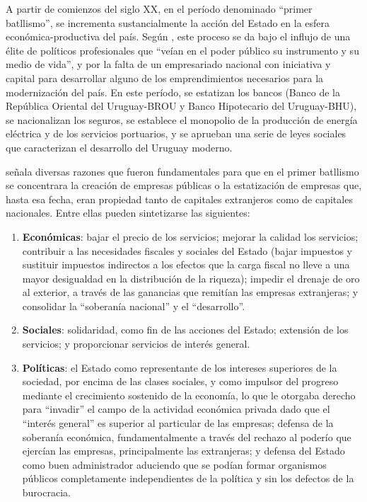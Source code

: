 \documentclass[
  12pt,
  spanish,
]{book}
\begin{document}
A partir de comienzos del siglo XX, en el período denominado ``primer
batllismo'', se incrementa sustancialmente la acción del Estado en la
esfera económica-productiva del país. Según \citet{Nahum1993}, este
proceso se da bajo el influjo de una élite de políticos profesionales
que ``veían en el poder público su instrumento y su medio de vida'', y
por la falta de un empresariado nacional con iniciativa y capital para
desarrollar alguno de los emprendimientos necesarios para la
modernización del país. En este período, se estatizan los bancos (Banco
de la República Oriental del Uruguay-BROU y Banco Hipotecario del
Uruguay-BHU), se nacionalizan los seguros, se establece el monopolio de
la producción de energía eléctrica y de los servicios portuarios, y se
aprueban una serie de leyes sociales que caracterizan el desarrollo del
Uruguay moderno.

\citet{Nahum1993} señala diversas razones que fueron fundamentales para
que en el primer batllismo se concentrara la creación de empresas
públicas o la estatización de empresas que, hasta esa fecha, eran
propiedad tanto de capitales extranjeros como de capitales nacionales.
Entre ellas pueden sintetizarse las siguientes:

\begin{enumerate}
\def\labelenumi{\arabic{enumi}.}
\item
  \textbf{Económicas}: bajar el precio de los servicios; mejorar la
  calidad los servicios; contribuir a las necesidades fiscales y
  sociales del Estado (bajar impuestos y sustituir impuestos indirectos
  a los efectos que la carga fiscal no lleve a una mayor desigualdad en
  la distribución de la riqueza); impedir el drenaje de oro al exterior,
  a través de las ganancias que remitían las empresas extranjeras; y
  consolidar la ``soberanía nacional'' y el ``desarrollo''.
\item
  \textbf{Sociales}: solidaridad, como fin de las acciones del Estado;
  extensión de los servicios; y proporcionar servicios de interés
  general.
\item
  \textbf{Políticas}: el Estado como representante de los intereses
  superiores de la sociedad, por encima de las clases sociales, y como
  impulsor del progreso mediante el crecimiento sostenido de la
  economía, lo que le otorgaba derecho para ``invadir'' el campo de la
  actividad económica privada dado que el ``interés general'' es
  superior al particular de las empresas; defensa de la soberanía
  económica, fundamentalmente a través del rechazo al poderío que
  ejercían las empresas, principalmente las extranjeras; y defensa del
  Estado como buen administrador aduciendo que se podían formar
  organismos públicos completamente independientes de la política y sin
  los defectos de la burocracia.
\end{enumerate}
\end{document}
